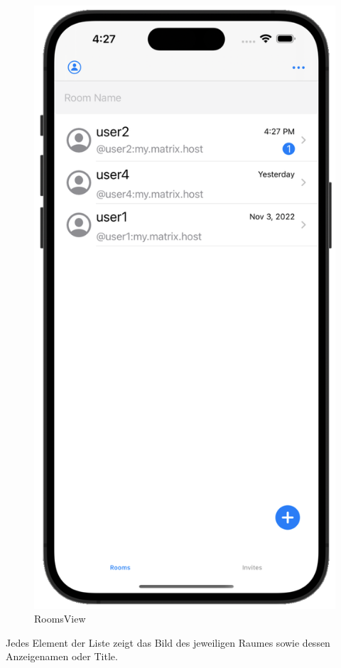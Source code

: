     \begin{figure}[h]
        \includegraphics[scale=0.5]{rooms_white}
        \centering
        \caption{RoomsView}\label{fig:roomsview}
    \end{figure}
    Jedes Element der Liste zeigt das Bild des jeweiligen Raumes sowie dessen Anzeigenamen oder Title.

